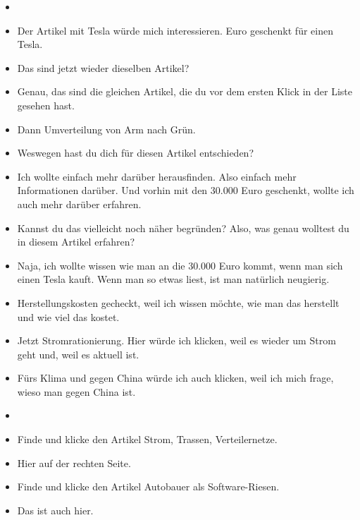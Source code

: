 {\begin{itemize}[]
            \item {}
            \item {} Der Artikel mit Tesla würde mich interessieren.  Euro geschenkt für einen Tesla\frqq{}.
            \item {} Das sind jetzt wieder dieselben Artikel?
            \item {} Genau, das sind die gleichen Artikel, die du vor dem ersten Klick in der Liste gesehen hast.
            \item {} Dann \flqq Umverteilung von Arm nach Grün\frqq{}.
            \item {} Weswegen hast du dich für diesen Artikel entschieden?
            \item {} Ich wollte einfach mehr darüber herausfinden.
                  Also einfach mehr Informationen darüber.
                  Und vorhin mit den 30.000 Euro geschenkt, wollte ich auch mehr darüber erfahren.
            \item {} Kannst du das vielleicht noch näher begründen?
                  Also, was genau wolltest du in diesem Artikel erfahren?
            \item {} Naja, ich wollte wissen wie man an die 30.000 Euro kommt, wenn man sich einen Tesla kauft.
                  Wenn man so etwas liest, ist man natürlich neugierig.
            \item {} \flqq Herstellungskosten gecheckt\frqq{}, weil ich wissen möchte, wie man das herstellt und wie viel das kostet.
            \item {} Jetzt \flqq Stromrationierung\frqq{}. Hier würde ich klicken, weil es wieder um Strom geht und, weil es aktuell ist.
            \item {} \flqq Fürs Klima und gegen China\frqq{} würde ich auch klicken, weil ich mich frage, wieso man gegen China ist.
            \item {}
            \item {} Finde und klicke den Artikel \flqq Strom, Trassen, Verteilernetze\frqq{}.
            \item {} Hier auf der rechten Seite.
            \item {} Finde und klicke den Artikel \flqq Autobauer als Software-Riesen\frqq{}.
            \item {} Das ist auch hier.

\end{itemize}}
